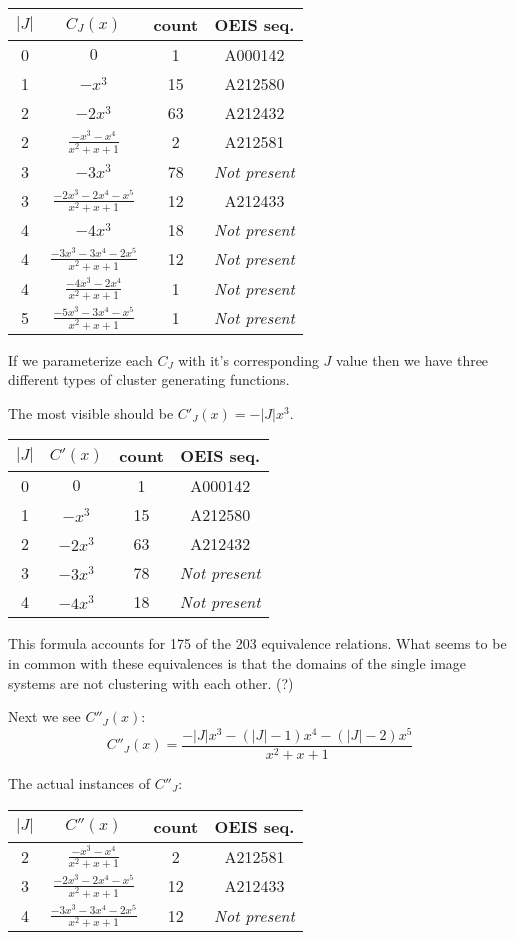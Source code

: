 \documentclass[openany, a4paper, 11pt, english]{article}
\theoremstyle{definition}
\begin{document}
\begin{center}
\begin{tabular}{c|c|c|c}
    $|J|$ & $C_J(x)$ & count & OEIS seq. \\
    \hline
    0 & $0$ & 1 & A000142 \\
    1 & $-x^3$ & 15 & A212580 \\
    2 & $-2x^3$ & 63 & A212432 \\
    2 & $\frac{-x^3-x^4}{x^2+x+1}$ & 2 & A212581 \\
    3 & $-3x^3$ & 78 & \emph{Not present} \\
    3 & $\frac{-2x^3-2x^4-x^5}{x^2+x+1}$ & 12 & A212433 \\
    4 & $-4x^3$ & 18 & \emph{Not present} \\
    4 & $\frac{-3x^3-3x^4-2x^5}{x^2+x+1}$ & 12 & \emph{Not present}\\
    4 & $\frac{-4x^3-2x^4}{x^2+x+1}$ & 1 & \emph{Not present} \\ 
    5 & $\frac{-5x^3-3x^4-x^5}{x^2+x+1}$ & 1 & \emph{Not present}\\
\end{tabular}
\end{center}

If we parameterize each $C_J$ with it's corresponding $J$ value then we have
three different types of cluster generating functions.

The most visible should be $C'_J(x) = -|J|x^3$.
\begin{center}
\begin{tabular}{c|c|c|c}
    $|J|$ & $C'(x)$ & count & OEIS seq. \\
    \hline
    0 & $0$ & 1 & A000142 \\
    1 & $-x^3$ & 15 & A212580 \\
    2 & $-2x^3$ & 63 & A212432 \\
    3 & $-3x^3$ & 78 & \emph{Not present} \\
    4 & $-4x^3$ & 18 & \emph{Not present} \\
\end{tabular}
\end{center}
This formula accounts for 175 of the 203 equivalence relations.
What seems to be in common with these equivalences is that the domains of the
single image systems are not clustering with each other. (?)

Next we see $C''_J(x)$:
\[
    C''_J(x) = \frac{-|J|x^3-(|J|-1)x^4-(|J|-2)x^5}{x^2+x+1}
\]

The actual instances of $C''_J$:
\begin{center}
\begin{tabular}{c|c|c|c}
    $|J|$ & $C''(x)$ & count & OEIS seq. \\
    \hline
    2 & $\frac{-x^3-x^4}{x^2+x+1}$ & 2 & A212581 \\
    3 & $\frac{-2x^3-2x^4-x^5}{x^2+x+1}$ & 12 & A212433 \\
    4 & $\frac{-3x^3-3x^4-2x^5}{x^2+x+1}$ & 12 & \emph{Not present}\\
\end{tabular}
\end{center}
\end{document}
